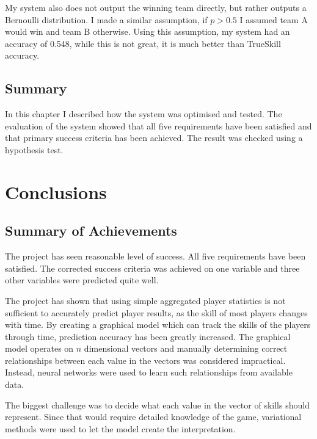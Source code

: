 \documentclass[12pt,a4paper]{book}
\begin{document}
My system also does not output the winning team directly, but rather outputs a Bernoulli distribution.
I made a similar assumption, if $p > 0.5$ I assumed team A would win and team B otherwise.
Using this assumption, my system had an accuracy of 0.548, while this is not great, it is much better than TrueSkill accuracy.

\section{Summary}
In this chapter I described how the system was optimised and tested.
The evaluation of the system showed that all five requirements have been satisfied and that primary success criteria has been achieved.
The result was checked using a hypothesis test.

\chapter{Conclusions}
\section{Summary of Achievements}
The project has seen reasonable level of success.
All five requirements have been satisfied.
The corrected success criteria was achieved on one variable and three other variables were predicted quite well.

The project has shown that using simple aggregated player statistics is not sufficient to accurately predict player results, as the skill of most players changes with time.
By creating a graphical model which can track the skills of the players through time, prediction accuracy has been greatly increased.
The graphical model operates on $n$ dimensional vectors and manually determining correct relationships between each value in the vectors was considered impractical.
Instead, neural networks were used to learn such relationships from available data.

The biggest challenge was to decide what each value in the vector of skills should represent.
Since that would require detailed knowledge of the game, variational methods were used to let the model create the interpretation.
\end{document}
